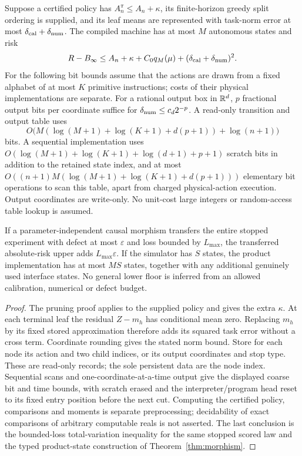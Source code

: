 \begin{corollary}\label{cor:autonomousdigital}
Suppose a certified policy has $A_n^\pi\le A_n+\kappa$, its finite-horizon greedy split ordering is supplied, and its leaf means are represented with task-norm error at most $\delta_{\rm cal}+\delta_{\rm num}$. The compiled machine has at most $M$ autonomous states and risk
\begin{equation}\label{eq:autonomouserrors}
 R-B_\infty\le A_n+\kappa+C_0q_M(\mu)
                 +(\delta_{\rm cal}+\delta_{\rm num})^2.
\end{equation}
For the following bit bounds assume that the actions are drawn from a fixed alphabet of at most $K$ primitive instructions; costs of their physical implementations are separate. For a rational output box in $\mathbb R^d$, $p$ fractional output bits per coordinate suffice for $\delta_{\rm num}\le c_d2^{-p}$. A read-only transition and output table uses
\[
 O\bigl(M(\log(M+1)+\log(K+1)+d(p+1)) +\log(n+1)\bigr)
\]
bits. A sequential implementation uses $O(\log(M+1)+\log(K+1)+\log(d+1)+p+1)$ scratch bits in addition to the retained state index, and at most $O((n+1)M(\log(M+1)+\log(K+1)+d(p+1)))$ elementary bit operations to scan this table, apart from charged physical-action execution. Output coordinates are write-only. No unit-cost large integers or random-access table lookup is assumed.

If a parameter-independent causal morphism transfers the entire stopped experiment with defect at most $\varepsilon$ and loss bounded by $L_{\max}$, the transferred absolute-risk upper adds $L_{\max}\varepsilon$. If the simulator has $S$ states, the product implementation has at most $MS$ states, together with any additional genuinely used interface states. No general lower floor is inferred from an allowed calibration, numerical or defect budget.
\end{corollary}
\begin{proof}
The pruning proof applies to the supplied policy and gives the extra $\kappa$. At each terminal leaf the residual $Z-m_h$ has conditional mean zero. Replacing $m_h$ by its fixed stored approximation therefore adds its squared task error without a cross term. Coordinate rounding gives the stated norm bound. Store for each node its action and two child indices, or its output coordinates and stop type. These are read-only records; the sole persistent data are the node index. Sequential scans and one-coordinate-at-a-time output give the displayed coarse bit and time bounds, with scratch erased and the interpreter/program head reset to its fixed entry position before the next cut. Computing the certified policy, comparisons and moments is separate preprocessing; decidability of exact comparisons of arbitrary computable reals is not asserted. The last conclusion is the bounded-loss total-variation inequality for the same stopped scored law and the typed product-state construction of Theorem~\ref{thm:morphism}.
\end{proof}

